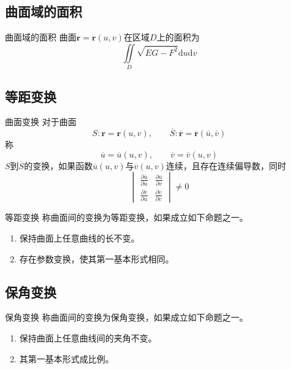 \documentclass[lang = cn, scheme = chinese, thmcnt = section]{elegantbook}
\newcommand{\bs}{\boldsymbol}          %
\newcommand{\dd}{\mathrm{d}}           %
\begin{document}
\subsection{曲面域的面积}

\begin{theorem}{曲面域的面积}
	曲面$\bs{r}=\bs{r}(u,v)$在区域$D$上的面积为%
	$$
	\iint\limits_{D}\sqrt{EG-F^2}\dd u\dd v
	$$
\end{theorem}

\subsection{等距变换}

\begin{theorem}{曲面变换}
	对于曲面%
	$$
	S:\bs{r}=\bs{r}(u,v),\qquad 
	\overline{S}:\overline{\bs{r}}=\overline{\bs{r}}(\overline{u},\overline{v})
	$$
	称%
	$$
	\overline{u}=\overline{u}(u,v),\qquad 
	\overline{v}=\overline{v}(u,v)
	$$
	$S$到$\overline{S}$的变换，如果函数$\overline{u}(u,v)$与$\overline{v}(u,v)$连续，且存在连续偏导数，同时
	$$
	\begin{vmatrix}
		\frac{\partial \overline{u}}{\partial u} & \frac{\partial \overline{u}}{\partial v}\\
		\frac{\partial \overline{v}}{\partial u} & \frac{\partial \overline{v}}{\partial v}
	\end{vmatrix}\ne 0
	$$
\end{theorem}

\begin{definition}{等距变换}
	称曲面间的变换为等距变换，如果成立如下命题之一。
	\begin{enumerate}
		\item 保持曲面上任意曲线的长不变。
		\item 存在参数变换，使其第一基本形式相同。
	\end{enumerate}
\end{definition}

\subsection{保角变换}

\begin{definition}{保角变换}
	称曲面间的变换为保角变换，如果成立如下命题之一。
	\begin{enumerate}
		\item 保持曲面上任意曲线间的夹角不变。
		\item 其第一基本形式成比例。
	\end{enumerate}
\end{definition}
\end{document}
